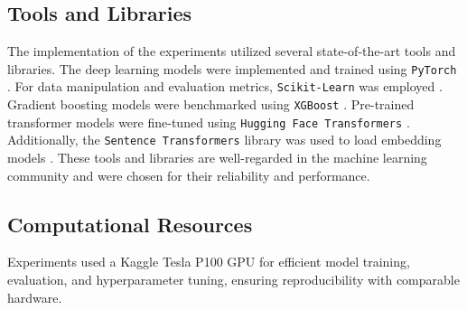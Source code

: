 \subsection{Tools and Libraries}

The implementation of the experiments utilized several state-of-the-art tools and libraries. The deep learning models were implemented and trained using \texttt{PyTorch} \citep{Paszke2019PyTorch}. For data manipulation and evaluation metrics, \texttt{Scikit-Learn} was employed \citep{Pedregosa2011ScikitLearn}. Gradient boosting models were benchmarked using \texttt{XGBoost} \citep{chen2016xgboost}. Pre-trained transformer models were fine-tuned using \texttt{Hugging Face Transformers} \citep{Wolf2019HuggingFace}. Additionally, the \texttt{Sentence Transformers} library was used to load embedding models \cite{reimers-2019-sentence-bert}\cite{reimers-2020-multilingual-sentence-bert}. These tools and libraries are well-regarded in the machine learning community and were chosen for their reliability and performance.

\subsection{Computational Resources}

Experiments used a Kaggle Tesla P100 GPU for efficient model training, evaluation, and hyperparameter tuning, ensuring reproducibility with comparable hardware.




